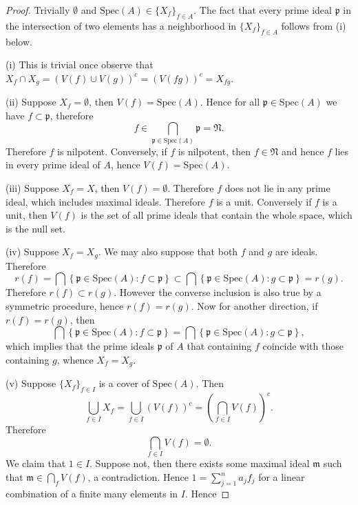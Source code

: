 \begin{proof}
Trivially $\emptyset$ and $\mathrm{Spec}(A)\in\{X_f\}_{f\in A}$. The fact that every prime ideal $\mathfrak{p}$ in the intersection of two elements has a neighborhood in $\{X_f\}_{f\in A}$ follows from (i) below.\par
(i) This is trivial once observe that $X_f\cap X_g=(V(f)\cup V(g))^c=(V(fg))^c=X_{fg}$.\par
(ii) Suppose $X_f=\emptyset$, then $V(f)=\mathrm{Spec}(A)$. Hence for all $\mathfrak{p}\in\mathrm{Spec}(A)$ we have $f\subset\mathfrak{p}$, therefore 
$$
f\in \bigcap_{\mathfrak{p} \in \mathrm{Spec}\left( A \right)}{\mathfrak{p}}=\mathfrak{N} .
$$
Therefore $f$ is nilpotent. Conversely, if $f$ is nilpotent, then $f\in\mathfrak{N}$ and hence $f$ lies in every prime ideal of $A$, hence $V(f)=\mathrm{Spec}(A)$.\par
(iii) Suppose $X_f=X$, then $V(f)=\emptyset$. Therefore $f$ does not lie in any prime ideal, which includes maximal ideals. Therefore $f$ is a unit. Conversely if $f$ is a unit, then $V(f)$ is the set of all prime ideals that contain the whole space, which is the null set.\par
(iv) Suppose $X_f=X_g$. We may also suppose that both $f$ and $g$ are ideals. Therefore 
$$
r\left( f \right) =\bigcap{\left\{ \mathfrak{p} \in \mathrm{Spec}\left( A \right) :f\subset \mathfrak{p} \right\}}\subset \bigcap{\left\{ \mathfrak{p} \in \mathrm{Spec}\left( A \right) :g\subset \mathfrak{p} \right\}}=r\left( g \right) .
$$
Therefore $r(f)\subset r(g)$. However the converse inclusion is also true by a symmetric procedure, hence $r(f)=r(g)$. Now for another direction, if $r(f)=r(g)$, then 
$$
\bigcap{\left\{ \mathfrak{p} \in \mathrm{Spec}\left( A \right) :f\subset \mathfrak{p} \right\}}=\bigcap{\left\{ \mathfrak{p} \in \mathrm{Spec}\left( A \right) :g\subset \mathfrak{p} \right\}},
$$
which implies that the prime ideals $\mathfrak{p}$ of $A$ that containing $f$ coincide with those containing $g$, whence $X_f=X_g$.\par
(v) Suppose $\{X_f\}_{f\in I}$ is a cover of $\mathrm{Spec}(A)$. Then 
$$
\bigcup_{f\in I}{X_f}=\bigcup_{f\in I}{\left( V\left( f \right) \right) ^c}=\left( \bigcap_{f\in I}{V\left( f \right)} \right) ^c.
$$
Therefore 
$$
\bigcap_{f\in I}{V\left( f \right)}=\emptyset .
$$
We claim that $1\in I$. Suppose not, then there exists some maximal ideal $\mathfrak{m}$ such that $\mathfrak{m}\in\bigcap_fV(f)$, a contradiction. Hence $1=\sum_{j=1}^na_jf_j$ for a linear combination of a finite many elements in $I$. Hence 

\end{proof}
